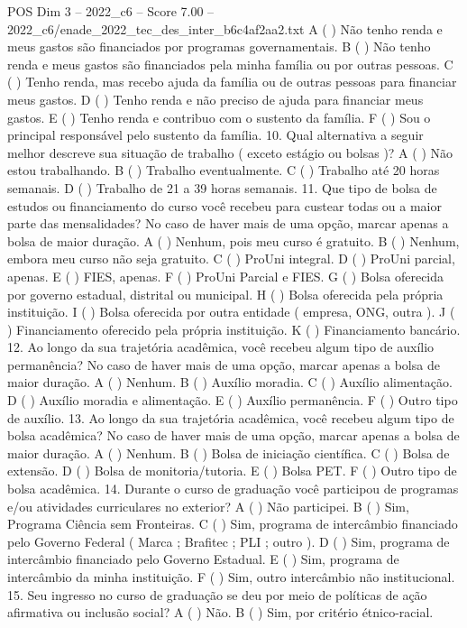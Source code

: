 \begin{textsample}{POS Dim 3 – 2022\_c6 – Score 7.00 – 2022\_c6/enade\_2022\_tec\_des\_inter\_b6c4af2aa2.txt}
A ( ) Não tenho renda e meus gastos são financiados por programas governamentais.
B ( ) Não tenho renda e meus gastos são financiados pela minha família ou por outras pessoas.
C ( ) Tenho renda, mas recebo ajuda da família ou de outras pessoas para financiar meus gastos.
D ( ) Tenho renda e não preciso de ajuda para financiar meus gastos.
E ( ) Tenho renda e contribuo com o sustento da família.
F ( ) Sou o principal responsável pelo sustento da família. 10.
Qual alternativa a seguir melhor descreve sua situação de trabalho ( exceto estágio ou bolsas )?
A ( ) Não estou trabalhando.
B ( ) Trabalho eventualmente.
C ( ) Trabalho até 20 horas semanais.
D ( ) Trabalho de 21 a 39 horas semanais. 11.
Que tipo de bolsa de estudos ou financiamento do curso você recebeu para custear todas ou a maior parte das mensalidades?
No caso de haver mais de uma opção, marcar apenas a bolsa de maior duração.
A ( ) Nenhum, pois meu curso é gratuito.
B ( ) Nenhum, embora meu curso não seja gratuito.
C ( ) ProUni integral.
D ( ) ProUni parcial, apenas.
E ( ) FIES, apenas.
F ( ) ProUni Parcial e FIES.
G ( ) Bolsa oferecida por governo estadual, distrital ou municipal.
H ( ) Bolsa oferecida pela própria instituição.
I ( ) Bolsa oferecida por outra entidade ( empresa, ONG, outra ).
J ( ) Financiamento oferecido pela própria instituição.
K ( ) Financiamento bancário. 12.
Ao longo da sua trajetória acadêmica, você recebeu algum tipo de auxílio permanência?
No caso de haver mais de uma opção, marcar apenas a bolsa de maior duração.
A ( ) Nenhum.
B ( ) Auxílio moradia.
C ( ) Auxílio alimentação.
D ( ) Auxílio moradia e alimentação.
E ( ) Auxílio permanência.
F ( ) Outro tipo de auxílio. 13.
Ao longo da sua trajetória acadêmica, você recebeu algum tipo de bolsa acadêmica?
No caso de haver mais de uma opção, marcar apenas a bolsa de maior duração.
A ( ) Nenhum.
B ( ) Bolsa de iniciação científica.
C ( ) Bolsa de extensão.
D ( ) Bolsa de monitoria/tutoria.
E ( ) Bolsa PET.
F ( ) Outro tipo de bolsa acadêmica. 14.
Durante o curso de graduação você participou de programas e/ou atividades curriculares no exterior?
A ( ) Não participei.
B ( ) Sim, Programa Ciência sem Fronteiras.
C ( ) Sim, programa de intercâmbio financiado pelo Governo Federal ( Marca ; Brafitec ; PLI ; outro ).
D ( ) Sim, programa de intercâmbio financiado pelo Governo Estadual.
E ( ) Sim, programa de intercâmbio da minha instituição.
F ( ) Sim, outro intercâmbio não institucional. 15.
Seu ingresso no curso de graduação se deu por meio de políticas de ação afirmativa ou inclusão social?
A ( ) Não.
B ( ) Sim, por critério étnico-racial.

\end{textsample}
